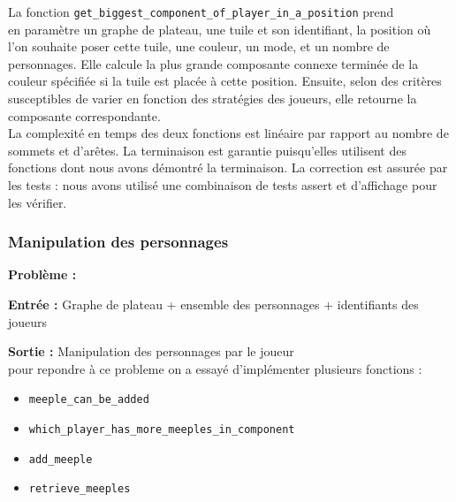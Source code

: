 La fonction \texttt{get\_biggest\_component\_of\_player\_in\_a\_position} prend \\en paramètre un graphe de plateau, une tuile et son identifiant, la position où l'on souhaite poser cette tuile, une couleur, un mode, et un nombre de personnages. Elle calcule la plus grande composante connexe terminée de la couleur spécifiée si la tuile est placée à cette position. Ensuite, selon des critères susceptibles de varier en fonction des stratégies des joueurs, elle retourne la composante correspondante.\\

La complexité en temps des deux fonctions est linéaire par rapport au nombre de sommets et d'arêtes. La terminaison est garantie puisqu'elles utilisent des fonctions dont nous avons démontré la terminaison. La correction est assurée par les tests : nous avons utilisé une combinaison de tests assert et d'affichage pour les vérifier.













\subsubsection{Manipulation des personnages}


\textbf{Problème :}

\textbf{Entrée :} Graphe de plateau + ensemble des personnages + identifiants des joueurs

\textbf{Sortie :} Manipulation des personnages par le joueur\\
pour repondre à ce probleme on a essayé d'implémenter plusieurs fonctions :
\begin{itemize}
\item \texttt{meeple\_can\_be\_added}
\item \texttt{which\_player\_has\_more\_meeples\_in\_component}
\item \texttt{add\_meeple}
\item \texttt{retrieve\_meeples}
\end{itemize}

